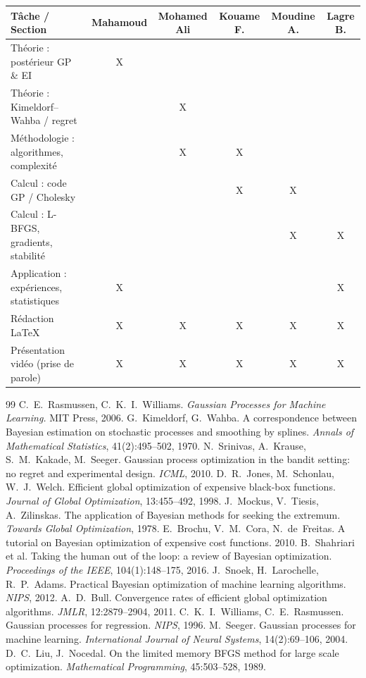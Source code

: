 \documentclass[12pt]{article}
\begin{document}
\begin{center}
\renewcommand{\arraystretch}{1.4}
\begin{tabular}{lccccc}
\toprule
\textbf{Tâche / Section} & Mahamoud & Mohamed Ali & Kouame F. & Moudine A. & Lagre B.\\
\midrule
Théorie : postérieur GP \& EI        & X &   &   &   &  \\
Théorie : Kimeldorf--Wahba / regret  &   & X &   &   &  \\
Méthodologie : algorithmes, complexité &   & X & X &   &  \\
Calcul : code GP / Cholesky          &   &   & X & X &  \\
Calcul : L-BFGS, gradients, stabilité &   &   &   & X & X\\
Application : expériences, statistiques & X &   &   &   & X\\
Rédaction LaTeX                      & X & X & X & X & X\\
Présentation vidéo (prise de parole) & X & X & X & X & X\\
\bottomrule
\end{tabular}
\end{center}

\newpage
\begin{thebibliography}{99}
 C.~E.~Rasmussen, C.~K.~I.~Williams.
\emph{Gaussian Processes for Machine Learning.} MIT Press, 2006.
 G.~Kimeldorf, G.~Wahba. A correspondence between Bayesian
estimation on stochastic processes and smoothing by splines.
\emph{Annals of Mathematical Statistics}, 41(2):495--502, 1970.
 N.~Srinivas, A.~Krause, S.~M.~Kakade, M.~Seeger. Gaussian
process optimization in the bandit setting: no regret and experimental design.
\emph{ICML}, 2010.
 D.~R.~Jones, M.~Schonlau, W.~J.~Welch. Efficient global
optimization of expensive black-box functions. \emph{Journal of Global
Optimization}, 13:455--492, 1998.
 J.~Mockus, V.~Tiesis, A.~Zilinskas. The application of
Bayesian methods for seeking the extremum. \emph{Towards Global Optimization}, 1978.
 E.~Brochu, V.~M.~Cora, N.~de~Freitas. A tutorial on Bayesian
optimization of expensive cost functions. 2010.
 B.~Shahriari et al. Taking the human out of the loop: a
review of Bayesian optimization. \emph{Proceedings of the IEEE},
104(1):148--175, 2016.
 J.~Snoek, H.~Larochelle, R.~P.~Adams. Practical Bayesian
optimization of machine learning algorithms. \emph{NIPS}, 2012.
 A.~D.~Bull. Convergence rates of efficient global optimization
algorithms. \emph{JMLR}, 12:2879--2904, 2011.
 C.~K.~I.~Williams, C.~E.~Rasmussen. Gaussian processes for
regression. \emph{NIPS}, 1996.
 M.~Seeger. Gaussian processes for machine learning.
\emph{International Journal of Neural Systems}, 14(2):69--106, 2004.
 D.~C.~Liu, J.~Nocedal. On the limited memory BFGS method for
large scale optimization. \emph{Mathematical Programming}, 45:503--528, 1989.
\end{thebibliography}
\end{document}
